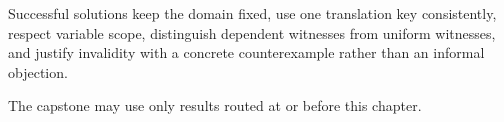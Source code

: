 \begin{remark*}
Successful solutions keep the domain fixed, use one translation key
consistently, respect variable scope, distinguish dependent witnesses from
uniform witnesses, and justify invalidity with a concrete counterexample rather
than an informal objection.
\end{remark*}

\begin{remark*}
The capstone may use only results routed at or before this chapter.
\end{remark*}

\clearpage
